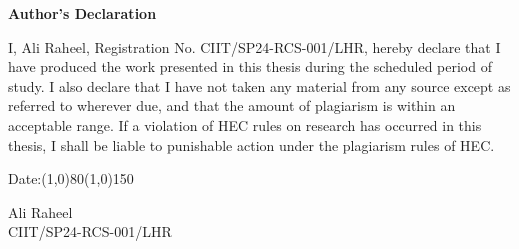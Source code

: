 \newpage
\begin{center}
\LARGE{\textbf{Author's Declaration}}\\
\vspace{0.1in}
\end{center}
\noindent\normalsize{I, Ali Raheel, Registration No. CIIT/SP24-RCS-001/LHR,
hereby declare that I have produced the work presented in this thesis during the
scheduled period of study. I also declare that I have not taken any material
from any source except as referred to wherever due, and that the amount of
plagiarism is within an acceptable range. If a violation of HEC rules on
research has occurred in this thesis, I shall be liable to punishable action
under the plagiarism rules of HEC.}\\

\vspace{1in}


Date:\line(1,0){80}\hfill\line(1,0){150}
\begin{flushright}
Ali Raheel\\
CIIT/SP24-RCS-001/LHR
\end{flushright}

